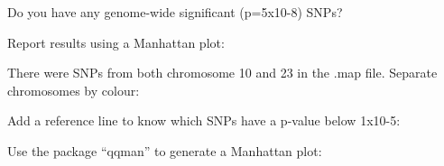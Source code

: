 \documentclass[]{book}
\newenvironment{Shaded}{\begin{snugshade}}{\end{snugshade}}
\newcommand{\KeywordTok}[1]{\textcolor[rgb]{0.13,0.29,0.53}{\textbf{#1}}}
\newcommand{\DataTypeTok}[1]{\textcolor[rgb]{0.13,0.29,0.53}{#1}}
\newcommand{\DecValTok}[1]{\textcolor[rgb]{0.00,0.00,0.81}{#1}}
\newcommand{\FloatTok}[1]{\textcolor[rgb]{0.00,0.00,0.81}{#1}}
\newcommand{\StringTok}[1]{\textcolor[rgb]{0.31,0.60,0.02}{#1}}
\newcommand{\OperatorTok}[1]{\textcolor[rgb]{0.81,0.36,0.00}{\textbf{#1}}}
\newcommand{\NormalTok}[1]{#1}
\begin{document}
Do you have any genome-wide significant (p=5x10-8) SNPs?

\begin{Shaded}
\end{Shaded}

Report results using a Manhattan plot:

\begin{Shaded}
\end{Shaded}

There were SNPs from both chromosome 10 and 23 in the .map file.
Separate chromosomes by colour:

\begin{Shaded}
\end{Shaded}

Add a reference line to know which SNPs have a p-value below 1x10-5:

\begin{Shaded}
\end{Shaded}

Use the package ``qqman'' to generate a Manhattan plot:
\end{document}
